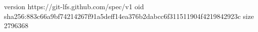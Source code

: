 version https://git-lfs.github.com/spec/v1
oid sha256:883c66a9bf74214267f91a5deff14ea376b2dabcc6f311511904f4219842923c
size 2796368
